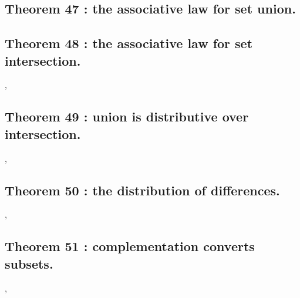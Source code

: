 \documentclass[preview]{standalone}
\begin{document}
\subsection[The associative law for set union.]
    {
        \color{section}Theorem 47 \color{black} : the associative law for set union.
    }

\pagebreak


\subsection[The associative law for set intersection.]
    {
        \color{section}Theorem 48 \color{black} : the associative law for set intersection.
    }

\sep


\subsection[Union is distributive over intersection.]
    {
        \color{section}Theorem 49 \color{black} : union is distributive over intersection.
    }

\sep
\pagebreak


\subsection[The distribution of differences.]
    {
        \color{section}Theorem 50 \color{black} : the distribution of differences.
    }

\sep
\pagebreak


\subsection[Complementation converts subsets.]
    {
        \color{section}Theorem 51 \color{black} : complementation converts subsets.
    }

\sep
\pagebreak


\end{document}
